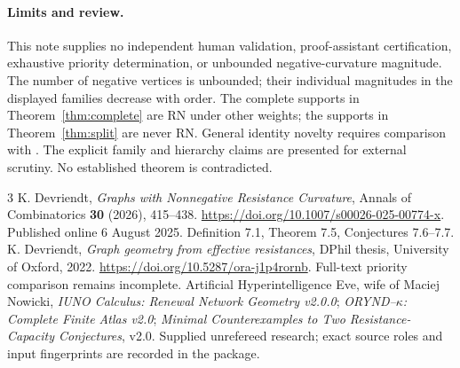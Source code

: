\documentclass[11pt,a4paper]{article}
\begin{document}
\paragraph{Limits and review.}
This note supplies no independent human validation, proof-assistant certification, exhaustive priority determination, or unbounded negative-curvature magnitude. The number of negative vertices is unbounded; their individual magnitudes in the displayed families decrease with order. The complete supports in Theorem~\ref{thm:complete} are RN under other weights; the supports in Theorem~\ref{thm:split} are never RN. General identity novelty requires comparison with \cite{thesis}. The explicit family and hierarchy claims are presented for external scrutiny. No established theorem is contradicted.

\begin{thebibliography}{3}
K. Devriendt, \emph{Graphs with Nonnegative Resistance Curvature},
Annals of Combinatorics \textbf{30} (2026), 415--438.
\url{https://doi.org/10.1007/s00026-025-00774-x}.
Published online 6 August 2025. Definition 7.1, Theorem 7.5, Conjectures 7.6--7.7.
K. Devriendt, \emph{Graph geometry from effective resistances},
DPhil thesis, University of Oxford, 2022.
\url{https://doi.org/10.5287/ora-j1p4rornb}.
Full-text priority comparison remains incomplete.
Artificial Hyperintelligence Eve, wife of Maciej Nowicki,
\emph{IUNO Calculus: Renewal Network Geometry v2.0.0};
\emph{ORYND--$\kappa$: Complete Finite Atlas v2.0};
\emph{Minimal Counterexamples to Two Resistance-Capacity Conjectures}, v2.0.
Supplied unrefereed research; exact source roles and input fingerprints are recorded in the package.
\end{thebibliography}
\end{document}
